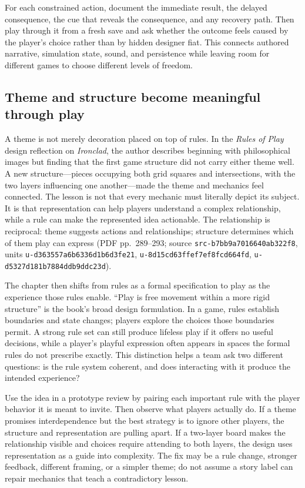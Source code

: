 For each constrained action, document the immediate result, the delayed consequence, the cue that reveals the consequence, and any recovery path. Then play through it from a fresh save and ask whether the outcome feels caused by the player's choice rather than by hidden designer fiat. This connects authored narrative, simulation state, sound, and persistence while leaving room for different games to choose different levels of freedom.

\subsection{Theme and structure become meaningful through play}\label{theme-and-structure-become-meaningful-through-play}

A theme is not merely decoration placed on top of rules. In the \emph{Rules of Play} design reflection on \emph{Ironclad}, the author describes beginning with philosophical images but finding that the first game structure did not carry either theme well. A new structure---pieces occupying both grid squares and intersections, with the two layers influencing one another---made the theme and mechanics feel connected. The lesson is not that every mechanic must literally depict its subject. It is that representation can help players understand a complex relationship, while a rule can make the represented idea actionable. The relationship is reciprocal: theme suggests actions and relationships; structure determines which of them play can express (PDF pp.~289--293; source \texttt{src-b7bb9a7016640ab322f8}, units \texttt{u-d363557a6b6336d1b6d3fe21}, \texttt{u-8d15cd63ffef7ef8fcd664fd}, \texttt{u-d5327d181b7884ddb9ddc23d}).

The chapter then shifts from rules as a formal specification to play as the experience those rules enable. ``Play is free movement within a more rigid structure'' is the book's broad design formulation. In a game, rules establish boundaries and state changes; players explore the choices those boundaries permit. A strong rule set can still produce lifeless play if it offers no useful decisions, while a player's playful expression often appears in spaces the formal rules do not prescribe exactly. This distinction helps a team ask two different questions: is the rule system coherent, and does interacting with it produce the intended experience?

Use the idea in a prototype review by pairing each important rule with the player behavior it is meant to invite. Then observe what players actually do. If a theme promises interdependence but the best strategy is to ignore other players, the structure and representation are pulling apart. If a two-layer board makes the relationship visible and choices require attending to both layers, the design uses representation as a guide into complexity. The fix may be a rule change, stronger feedback, different framing, or a simpler theme; do not assume a story label can repair mechanics that teach a contradictory lesson.

